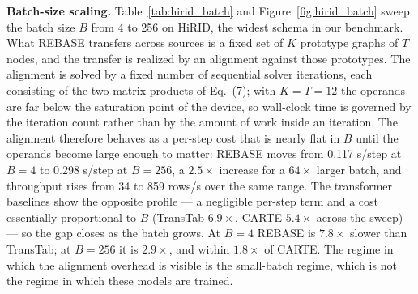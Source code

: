 \textbf{Batch-size scaling.}
Table~\ref{tab:hirid_batch} and Figure~\ref{fig:hirid_batch} sweep the batch size
$B$ from 4 to 256 on HiRID, the widest schema in our benchmark. What REBASE
transfers across sources is a fixed set of $K$ prototype graphs of $T$ nodes, and
the transfer is realized by an alignment against those prototypes. The alignment
is solved by a fixed number of sequential solver iterations, each consisting of
the two matrix products of Eq.~(7); with $K=T=12$ the operands are far below the
saturation point of the device, so wall-clock time is governed by the iteration
count rather than by the amount of work inside an iteration. The alignment
therefore behaves as a per-step cost that is nearly flat in $B$ until the
operands become large enough to matter: REBASE moves from 0.117 s/step at
$B{=}4$ to 0.298 s/step at $B{=}256$, a $2.5\times$ increase for a $64\times$
larger batch, and throughput rises from 34 to 859 rows/s over the same range.
The transformer baselines show the opposite profile — a negligible per-step term
and a cost essentially proportional to $B$ (TransTab $6.9\times$, CARTE
$5.4\times$ across the sweep) — so the gap closes as the batch grows. At $B{=}4$
REBASE is $7.8\times$ slower than TransTab; at $B{=}256$ it is $2.9\times$, and
within $1.8\times$ of CARTE. The regime in which the alignment overhead is
visible is the small-batch regime, which is not the regime in which these models
are trained.

